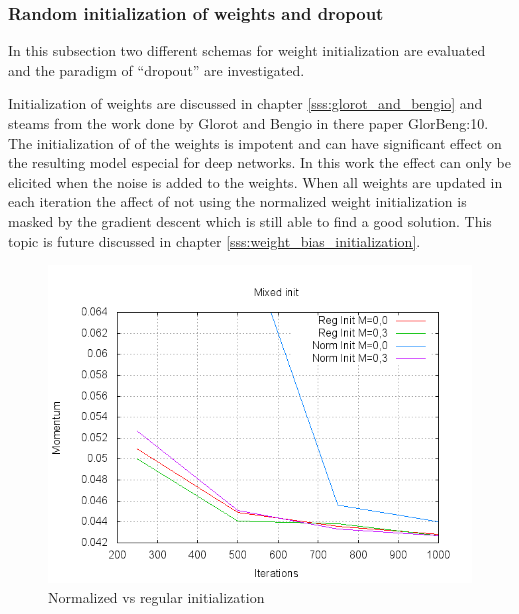\subsubsection{Random initialization of weights and dropout} \label{sss:boosting_mlp_weight_init}
In this subsection two different schemas for weight initialization are evaluated and the paradigm of ``dropout'' are investigated. 

Initialization of weights are discussed in chapter \ref{sss:glorot_and_bengio} and steams from the work done by Glorot and Bengio in there paper \cite{art}{GlorBeng:10}. The initialization of of the weights is impotent and can have significant effect on the resulting model especial for deep networks. In this work the effect can only be elicited when the noise is added to the weights. When all weights are updated in each iteration the affect of not using the normalized weight initialization is masked by the gradient descent which is still able to find a good solution. This topic is future discussed in chapter \ref{sss:weight_bias_initialization}.

\begin{figure}
\vspace{-20pt}
\begin{center}
\includegraphics[scale=0.42]{eval33ef.png}
\end{center}
\vspace{-20pt}
\caption{Normalized vs regular initialization}
\label{norm_init}
\end{figure} %

